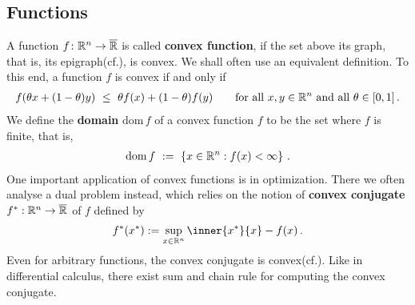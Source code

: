 \subsection*{Functions}
A function 
$
f
\colon
\mathbb{R}^n
\to
\overline{\mathbb{R}}
$
is called \textbf{convex function}, if the set above its graph, that is, its epigraph(cf.), is convex. We shall often use an equivalent definition. To this end, a function $f$ is convex if and only if 
\begin{gather}
  f(\theta x + (1-\theta)y)
  \ 
  \le
  \ 
  \theta f(x)
  +
  (1-\theta)f(y)
  \qquad
  \text{for all}\ 
  x,y\in \R^n
  \ 
  \text{and all}\ 
  \theta\in[0,1]
  \,.
\end{gather}
We define the \textbf{domain} $\mathrm{dom}\,f$
of a convex function $f$ to be the set where $f$ is finite, that is,
\begin{gather}
  \mathrm{dom}\,f
  \ 
  :=
  \ 
  \left\{ 
x\in\R^n
:
f(x)<\infty
  \right\}
  \,.
\end{gather}
One important application of convex functions is in optimization.
There we often analyse a dual problem instead, which relies on the notion of \textbf{convex conjugate} 
$
    f^*:
    \mathbb{R}^n \to \overline{\mathbb{R}}
  $
  of $f$ defined by
  \begin{gather}
    f^*(x^*)
    :=
    \sup_{ x \in \R^n }
    \inner
    {x^*}{x}
    - f(x)
    \,.
  \end{gather}
  Even for arbitrary functions, the convex conjugate is convex(cf.).
  Like in differential calculus, there exist sum and chain rule for computing the convex conjugate.
